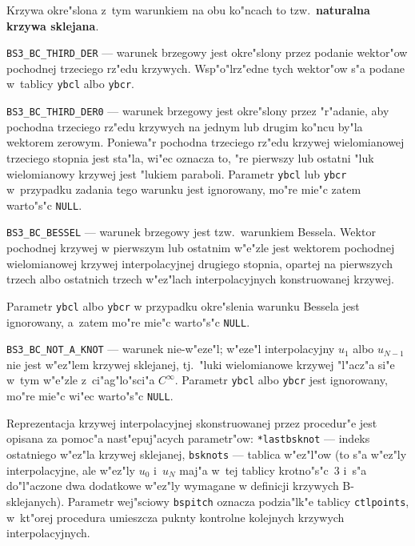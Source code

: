 \begin{mydescription}
    Krzywa okre"slona z~tym warunkiem na obu ko"ncach to tzw.\
    \textbf{naturalna krzywa sklejana}.
  \item[]\texttt{BS3\_BC\_THIRD\_DER} --- warunek brzegowy jest okre"slony
    przez podanie wektor"ow pochodnej trzeciego rz"edu krzywych.
    Wsp"o"lrz"edne tych wektor"ow s"a podane w~tablicy \texttt{ybcl} albo
    \texttt{ybcr}.
  \item[]\texttt{BS3\_BC\_THIRD\_DER0} --- warunek brzegowy jest okre"slony
    przez "r"adanie, aby pochodna trzeciego rz"edu krzywych na jednym lub
    drugim ko"ncu by"la wektorem zerowym. Poniewa"r pochodna trzeciego
    rz"edu krzywej wielomianowej trzeciego stopnia jest sta"la, wi"ec
    oznacza to, "re pierwszy lub ostatni "luk wielomianowy krzywej jest
    "lukiem paraboli. Parametr \texttt{ybcl} lub \texttt{ybcr} w~przypadku
    zadania tego warunku jest ignorowany, mo"re mie"c zatem warto"s"c
    \texttt{NULL}.
  \item[]\texttt{BS3\_BC\_BESSEL} --- warunek brzegowy jest tzw.\ warunkiem
    Bessela. Wektor pochodnej krzywej w pierwszym lub ostatnim w"e"zle jest
    wektorem pochodnej wielomianowej krzywej interpolacyjnej drugiego
    stopnia, opartej na pierwszych trzech albo ostatnich trzech w"ez"lach
    interpolacyjnych konstruowanej krzywej.

    Parametr \texttt{ybcl} albo \texttt{ybcr} w przypadku okre"slenia
    warunku Bessela jest ignorowany, a~zatem mo"re mie"c warto"s"c
    \texttt{NULL}.
  \item[]\texttt{BS3\_BC\_NOT\_A\_KNOT} --- warunek nie-w"eze"l; w"eze"l
    interpolacyjny $u_1$ albo $u_{N-1}$ nie jest w"ez"lem krzywej sklejanej,
    tj.\ "luki wielomianowe krzywej "l"acz"a si"e w~tym w"e"zle
    z~ci"ag"lo"sci"a $C^\infty$. Parametr \texttt{ybcl} albo \texttt{ybcr}
    jest ignorowany, mo"re mie"c wi"ec warto"s"c \texttt{NULL}.
\end{mydescription}

Reprezentacja krzywej interpolacyjnej skonstruowanej przez procedur"e
jest opisana za pomoc"a nast"epuj"acych parametr"ow: \texttt{*lastbsknot}
--- indeks ostatniego w"ez"la krzywej sklejanej, \texttt{bsknots} ---
tablica w"ez"l"ow (to s"a w"ez"ly interpolacyjne, ale w"ez"ly $u_0$ i~$u_N$
maj"a w~tej tablicy krotno"s"c~$3$ i~s"a do"l"aczone dwa dodatkowe w"ez"ly
wymagane w definicji krzywych B-sklejanych). Parametr wej"sciowy
\texttt{bspitch}
oznacza podzia"lk"e tablicy \texttt{ctlpoints}, w~kt"orej procedura
umieszcza puknty kontrolne kolejnych krzywych interpolacyjnych.



